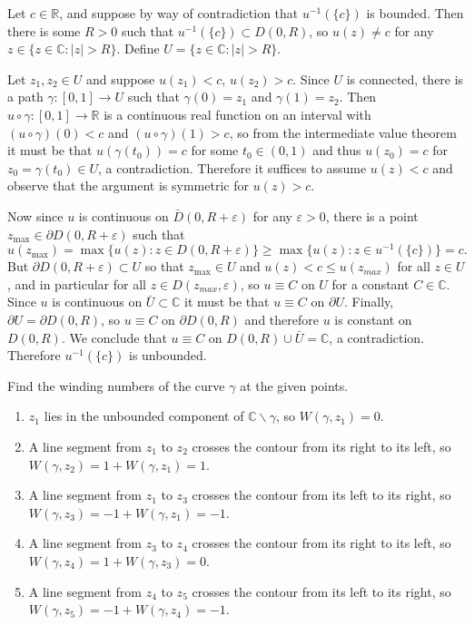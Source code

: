 \documentclass{article}
\newcounter{Problem}
\newenvironment{Problem}{\begin{Exercise}[name={Problem},
                                          counter={Problem}]}
                        {\end{Exercise}}
\begin{document}
\begin{Answer}
Let $c \in \mathbb{R}$, and suppose by way of contradiction that
$u^{-1}(\{ c \})$ is bounded. Then there is some $R > 0$ such that
$u^{-1}(\{ c \}) \subset D(0, R)$, so $u(z) \neq c$ for any
$z \in \{ z \in \mathbb{C} : |z| > R \}$. Define
$U = \{ z \in \mathbb{C} : |z| > R \}$.

Let $z_1, z_2 \in U$ and suppose $u(z_1) < c$, $u(z_2) > c$.
Since $U$ is connected, there is a path
$\gamma : [0, 1] \to U$ such that $\gamma(0) = z_1$ and
$\gamma(1) = z_2$. Then
$u \circ \gamma : [0, 1] \to \mathbb{R}$ is a continuous
real function on an interval
with $(u \circ \gamma)(0) < c$ and
$(u \circ \gamma)(1) > c$, so from the intermediate value
theorem it must be that $u(\gamma(t_0)) = c$ for some
$t_0 \in (0, 1)$ and thus
$u(z_0) = c$ for $z_0 = \gamma(t_0) \in U$, a contradiction.
Therefore it suffices to assume $u(z) < c$
and observe that the argument is symmetric for $u(z) > c$.

Now since $u$ is continuous on $\bar{D}(0, R + \varepsilon)$
for any $\varepsilon > 0$, there is a
point $z_{\max} \in \partial D(0, R + \varepsilon)$ such that
$$
     u(z_{\max}) 
=    \max\{ u(z) : z \in D(0, R + \varepsilon) \} 
\geq \max\{ u(z) : z \in u^{-1}(\{c\}) \}
=    c.
$$
But $\partial D(0, R + \varepsilon) \subset U$ so that
$z_{\max} \in U$ and $u(z) < c \leq u(z_{max})$
for all $z \in U$, and in particular for all 
$z \in D(z_{max}, \varepsilon)$, so $u \equiv C$ on 
$U$ for a constant $C \in \mathbb{C}$. Since $u$ is continuous on
$\bar{U} \subset \mathbb{C}$ it must be that $u \equiv C$ on
$\partial U$.
Finally, $\partial U = \partial D(0, R)$, so $u \equiv C$ on
$\partial D(0, R)$ and therefore $u$ is constant on $D(0, R)$.
We conclude that $u \equiv C$ on
$D(0, R) \cup \bar{U} = \mathbb{C}$, a contradiction.
Therefore $u^{-1}(\{ c \})$ is unbounded.
\end{Answer}

\begin{Problem}
Find the winding numbers of the curve $\gamma$ at the given points.
\end{Problem}

\begin{Answer}
\begin{enumerate}
  \item{
    $z_1$ lies in the unbounded component of
    $\mathbb{C} \backslash \gamma$, so $W(\gamma, z_1) = 0$.
  }
  \item{
    A line segment from $z_1$ to $z_2$ crosses the contour from its
    right to its left, so $W(\gamma, z_2) = 1 + W(\gamma, z_1) = 1$.
  }
  \item{
    A line segment from $z_1$ to $z_3$ crosses the contour from its
    left to its right, so $W(\gamma, z_3) = -1 + W(\gamma, z_1) = -1$.
  }
  \item{
    A line segment from $z_3$ to $z_4$ crosses the contour from its
    right to its left, so $W(\gamma, z_4) = 1 + W(\gamma, z_3) = 0$.
  }
  \item{
    A line segment from $z_4$ to $z_5$ crosses the contour from its
    left to its right, so $W(\gamma, z_5) = -1 + W(\gamma, z_4) = -1$.
  }
\end{enumerate}
\end{Answer}
\end{document}
